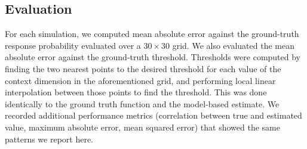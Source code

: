 \documentclass[../main.tex]{subfiles}
\begin{document}
\subsection{Evaluation}
For each simulation, we computed mean absolute error against the ground-truth response probability evaluated over a $30\times 30$ grid. We also evaluated the mean absolute error against the ground-truth threshold. Thresholds were computed by finding the two nearest points to the desired threshold for each value of the context dimension in the aforementioned grid, and performing local linear interpolation between those points to find the threshold. This was done identically to the ground truth function and the model-based estimate. We recorded additional performance metrics (correlation between true and estimated value, maximum absolute error, mean squared error) that showed the same patterns we report here.
\end{document}
